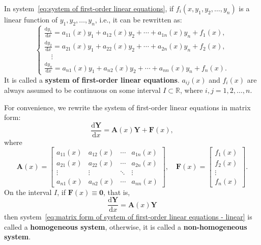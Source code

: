 \documentclass[11pt]{../../TexTemplate/elegantbook}
\begin{document}
\vspace{0.7cm}
In system~\eqref{eq:system of first-order linear equations},
if \(f_{i}(x, y_{1}, y_{2}, \ldots, y_{n})\) is a linear function of \(y_{1}, y_{2}, \ldots, y_{n}\), 
i.e., it can be rewritten as:
\[
\begin{cases} 
    \frac{\mathrm{d}y_{1}}{\mathrm{d}x} = a_{11}(x)y_{1} + a_{12}(x)y_{2} + \cdots + a_{1n}(x)y_{n} + f_{1}(x), \\ 
    \frac{\mathrm{d}y_{2}}{\mathrm{d}x} = a_{21}(x)y_{1} + a_{22}(x)y_{2} + \cdots + a_{2n}(x)y_{n} + f_{2}(x), \\ 
    \quad\vdots \\ 
    \frac{\mathrm{d}y_{n}}{\mathrm{d}x} = a_{n1}(x)y_{1} + a_{n2}(x)y_{2} + \cdots + a_{nn}(x)y_{n} + f_{n}(x).
\end{cases}
\]
It is called a \textbf{system of first-order linear equations}.
\(a_{ij}(x)\) and \(f_{i}(x)\) are always assumed to be continuous on some interval \(I \subset \mathbb{R}\), 
where \(i, j = 1, 2, \ldots, n\).

For convenience, we rewrite the system of first-order linear equations in matrix form:
\begin{equation}\label{eq:matrix form of system of first-order linear equations - linear}
    \frac{\mathrm{d}\mathbf{Y}}{\mathrm{d}x} = \mathbf{A}(x) \mathbf{Y} + \mathbf{F}(x),
\end{equation}
where
\[
\mathbf{A}(x) = 
\begin{bmatrix} 
    a_{11}(x) & a_{12}(x) & \cdots & a_{1n}(x) \\ 
    a_{21}(x) & a_{22}(x) & \cdots & a_{2n}(x) \\ 
    \vdots & \vdots & \ddots & \vdots \\ 
    a_{n1}(x) & a_{n2}(x) & \cdots & a_{nn}(x)
\end{bmatrix}, \quad
\mathbf{F}(x) =
\begin{bmatrix}
    f_{1}(x) \\ f_{2}(x) \\ \vdots \\ f_{n}(x)
\end{bmatrix}.
\]
On the interval \(I\), if \(\mathbf{F}(x) \equiv \mathbf{0}\), that is,
\begin{equation}\label{eq:matrix form of system of first-order linear equations - linear and homogeneous}
\frac{\mathrm{d}\mathbf{Y}}{\mathrm{d}x} = \mathbf{A}(x) \mathbf{Y}
\end{equation}
then system~\eqref{eq:matrix form of system of first-order linear equations - linear} is called a \textbf{homogeneous system},
otherwise, it is called a \textbf{non-homogeneous system}.
\end{document}
